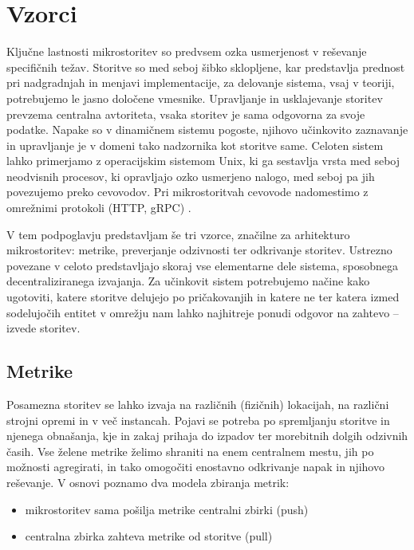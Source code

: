 \documentclass[a4paper, 12pt]{book}
\begin{document}
\section{Vzorci}

Ključne lastnosti mikrostoritev so predvsem ozka usmerjenost v reševanje specifičnih težav.
Storitve so med seboj šibko sklopljene, kar predstavlja prednost pri nadgradnjah in menjavi implementacije, za delovanje sistema, vsaj v teoriji, potrebujemo le jasno določene vmesnike.
Upravljanje in usklajevanje storitev prevzema centralna avtoriteta, vsaka storitev je sama odgovorna za svoje podatke.
Napake so v dinamičnem sistemu pogoste, njihovo učinkovito zaznavanje in upravljanje je v domeni tako nadzornika kot storitve same.
Celoten sistem lahko primerjamo z operacijskim sistemom Unix, ki ga sestavlja vrsta med seboj neodvisnih procesov, ki opravljajo ozko usmerjeno nalogo, med seboj pa jih povezujemo preko cevovodov.
Pri mikrostoritvah cevovode nadomestimo z omrežnimi protokoli (HTTP, gRPC) \cite{microservicesMartin}.

V tem podpoglavju predstavljam še tri vzorce, značilne za arhitekturo mikrostoritev: metrike, preverjanje odzivnosti ter odkrivanje storitev.
Ustrezno povezane v celoto predstavljajo skoraj vse elementarne dele sistema, sposobnega decentraliziranega izvajanja.
Za učinkovit sistem potrebujemo načine kako ugotoviti, katere storitve delujejo po pričakovanjih in katere ne ter katera izmed sodelujočih entitet v omrežju nam lahko najhitreje ponudi odgovor na zahtevo -- izvede storitev.

\subsection{Metrike}

Posamezna storitev se lahko izvaja na različnih (fizičnih) lokacijah, na različni strojni opremi in v več instancah.
Pojavi se potreba po spremljanju storitve in njenega obnašanja, kje in zakaj prihaja do izpadov ter morebitnih dolgih odzivnih časih.
Vse želene metrike želimo shraniti na enem centralnem mestu, jih po možnosti agregirati, in tako omogočiti enostavno odkrivanje napak in njihovo reševanje.
V osnovi poznamo dva modela zbiranja metrik: 
\begin{itemize}
	\item mikrostoritev sama pošilja metrike centralni zbirki (push)
	\item centralna zbirka zahteva metrike od storitve (pull)
\end{itemize}
\end{document}
